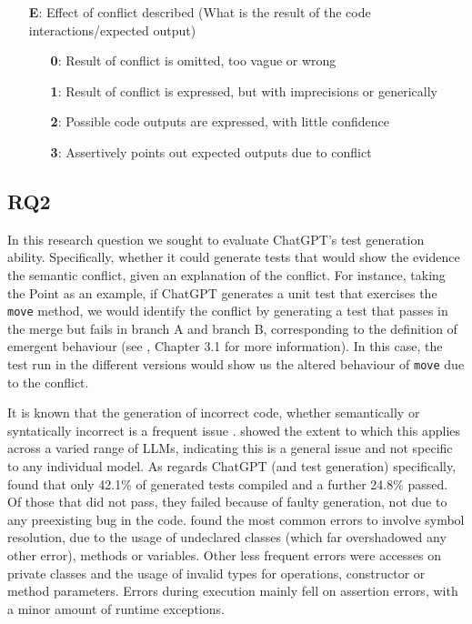\begin{itemize}
  \item[\textbf{E}:] Effect of conflict described (What is the result of the code interactions/expected output)
  \begin{itemize}
    \item[\textbf{0}:] Result of conflict is omitted, too vague or wrong
    \item[\textbf{1}:] Result of conflict is expressed, but with imprecisions or generically
    \item[\textbf{2}:] Possible code outputs are expressed, with little confidence
    \item[\textbf{3}:] Assertively points out expected outputs due to conflict
  \end{itemize}
\end{itemize}


\subsection{RQ2}

In this research question we sought to evaluate ChatGPT's test generation ability. Specifically, whether it could generate tests that would show the evidence the semantic conflict, given an explanation of the conflict.
For instance, taking the Point as an example, if ChatGPT generates a unit test that exercises the \texttt{move} method, we would identify the conflict by generating a test that passes in the merge but fails in branch A and branch B, corresponding to the definition of emergent behaviour (see \citet{kn:nuno}, Chapter 3.1 for more information).
In this case, the test run in the different versions would show us the altered behaviour of \texttt{move} due to the conflict.

It is known that the generation of incorrect code, whether semantically or syntatically incorrect is a frequent issue .  showed the extent to which this applies across a varied range of LLMs,
indicating this is a general issue and not specific to any individual model. As regards ChatGPT (and test generation) specifically,  found that only 42.1\% of generated tests compiled and a further
24.8\% passed. Of those that did not pass, they failed because of faulty generation, not due to any preexisting bug in the code.
 found the most common errors to involve symbol resolution, due to the usage of undeclared classes (which far overshadowed any other error), methods or variables. Other less frequent errors were accesses on private classes and the usage
of invalid types for operations, constructor or method parameters.
Errors during execution mainly fell on assertion errors, with a minor amount of runtime exceptions.

